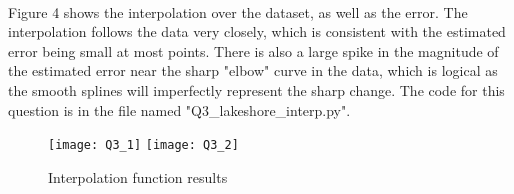 \documentclass{article}
\newcommand{\<}[1]{\left\langle #1 \right\rangle }
\begin{document}
\\
Figure 4 shows the interpolation over the dataset, as well as the error. The interpolation follows the data very closely, which is consistent with the estimated error being small at most points. There is also a large spike in the magnitude of the estimated error near the sharp "elbow" curve in the data, which is logical as the smooth splines will imperfectly represent the sharp change. The code for this question is in the file named "Q3\_lakeshore\_interp.py".
\begin{figure}
	\caption{Interpolation function results}
	\texttt{[image: Q3\_1]}
	\texttt{[image: Q3\_2]}
\end{figure}

\section{}
\end{document}
